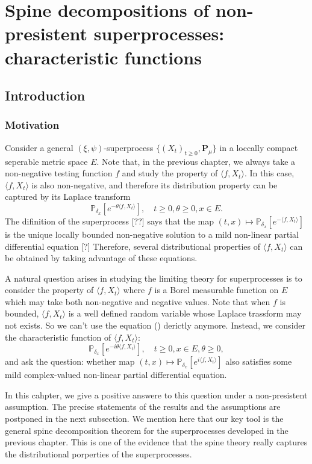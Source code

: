 \chapter{Spine decompositions of non-presistent superprocesses: characteristic functions}
\section{Introduction}
\subsection{Motivation}
    Consider a general $(\xi,\psi)$-superprocess $\{(X_t)_{t\geq 0}, \mathbf P_\mu\}$ in a loccally compact seperable metric space $E$.
    Note that, in the previous chapter, we always take a non-negative testing function $f$ and study the property of $\langle f,X_t\rangle$.
    In this case, $\langle f, X_t\rangle$ is also non-negative, and therefore its distribution property can be captured by its Laplace transform 
\[
    \mathbb P_{\delta_x}[e^{-\theta\langle f,X_t\rangle}],\quad t\geq 0, \theta \geq 0, x\in E.
\] 
    The difinition of the superprocess [??] says that the map $(t,x)\mapsto \mathbb P_{\delta_x}[e^{- \langle f,X_t\rangle}]$ is the unique locally bounded non-negative solution to a mild non-linear partial differential equation [?]
    Therefore, several distributional properties of $\langle f, X_t\rangle$ can be obtained by taking advantage of these equations.

    A natural question arises in studying the limiting theory for superprocesses is to consider the property of $\langle f,X_t\rangle$ where $f$ is a Borel measurable function on $E$ which may take both non-negative and negative values.
    Note that when $f$ is bounded, $\langle f,X_t\rangle$ is a well defined random variable whose Laplace trassform may not exists. 
    So we can't use the equation () derictly anymore.
    Instead, we consider the characteristic function of $\langle f,X_t\rangle$:
\[
    \mathbb P_{\delta_x}[e^{-i\theta \langle f,X_t\rangle}],\quad t\geq 0, x\in E, \theta \geq 0,
\]
    and ask the question: whether map $(t,x)\mapsto \mathbb P_{\delta_x}[e^{i\langle f,X_t\rangle}]$ also satisfies some mild complex-valued non-linear partial differential equation.

    In this cahpter, we give a positive answere to this question under a non-presistent assumption.
    The precise statements of the results and the assumptions are postponed in the next subsection.
    We mention here that our key tool is the general spine decomposition theorem for the superprocesses developed in the previous chapter. 
    This is one of the evidence that the spine theory really captures the distributional porperties of the superprocesses. 

